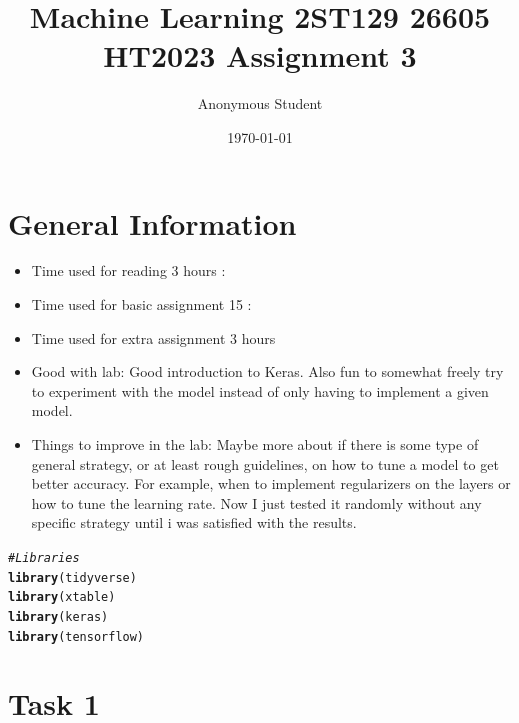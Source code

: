 \documentclass[10pt, a4paper, english]{article}\usepackage[]{graphicx}\usepackage[dvipsnames]{xcolor}
\title{Machine Learning 2ST129 26605 HT2023
 Assignment 3}
\author{Anonymous Student}
\date{\today}
\makeatletter
\newcommand{\hlcom}[1]{\textcolor[rgb]{0.678,0.584,0.686}{\textit{#1}}}%
\newcommand{\hlstd}[1]{\textcolor[rgb]{0.345,0.345,0.345}{#1}}%
\newcommand{\hlkwd}[1]{\textcolor[rgb]{0.737,0.353,0.396}{\textbf{#1}}}%
\newenvironment{kframe}{%
 \def\at@end@of@kframe{}%
 \ifinner\ifhmode%
  \def\at@end@of@kframe{\end{minipage}}%
  \begin{minipage}{\columnwidth}%
 \fi\fi%
 \def\FrameCommand##1{\hskip\@totalleftmargin \hskip-\fboxsep
 \colorbox{shadecolor}{##1}\hskip-\fboxsep
     \hskip-\linewidth \hskip-\@totalleftmargin \hskip\columnwidth}%
 \MakeFramed {\advance\hsize-\width
   \@totalleftmargin\z@ \linewidth\hsize
   \@setminipage}}%
 {\par\unskip\endMakeFramed%
 \at@end@of@kframe}
\newenvironment{knitrout}{}{} %
\makeatother
\begin{document}
\maketitle
\newpage
\tableofcontents
\newpage




\section*{General Information}
\begin{itemize}
\item Time used for reading 3 hours : 
\item Time used for basic assignment 15 :
\item Time used for extra assignment 3 hours 
\item Good with lab: Good introduction to Keras. Also fun to somewhat freely try to experiment with the model instead of only having to implement a given model. 
\item Things to improve in the lab: Maybe more about if there is some type of general strategy, or at least rough guidelines,  on how to tune a model to get better accuracy. For example, when to implement regularizers on the layers or how to tune the learning rate. Now I just tested it randomly without any specific strategy until i was satisfied with the results. 
\end{itemize}

\begin{knitrout}
\color{fgcolor}\begin{kframe}
\begin{alltt}
\hlcom{#Libraries}
 \hlkwd{library}\hlstd{(tidyverse)}
 \hlkwd{library}\hlstd{(xtable)}
 \hlkwd{library}\hlstd{(keras)}
 \hlkwd{library}\hlstd{(tensorflow)}
\end{alltt}
\end{kframe}
\end{knitrout}

\section{Task 1}
\end{document}
